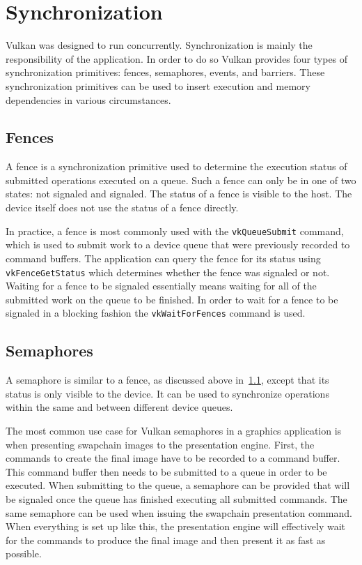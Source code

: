   \section{Synchronization}
    Vulkan was designed to run concurrently. Synchronization is mainly the responsibility of the \gls{application}. In order to do so Vulkan provides four types of synchronization primitives: fences, semaphores, events, and barriers. These synchronization primitives can be used to insert execution and memory dependencies in various circumstances.

    \subsection{Fences}
    \label{sub:Fences}
      A fence is a synchronization primitive used to determine the execution status of submitted operations executed on a queue. Such a fence can only be in one of two states: not signaled and signaled. The status of a fence is visible to the \gls{host}. The device itself does not use the status of a fence directly.

      In practice, a fence is most commonly used with the \lstinline{vkQueueSubmit} command, which is used to submit work to a device queue that were previously recorded to command buffers. The \gls{application} can query the fence for its status using \lstinline{vkFenceGetStatus} which determines whether the fence was signaled or not. Waiting for a fence to be signaled essentially means waiting for all of the submitted work on the queue to be finished. In order to wait for a fence to be signaled in a blocking fashion the \lstinline{vkWaitForFences} command is used.

    \subsection{Semaphores}
    \label{sub:Semaphores}
      A semaphore is similar to a fence, as discussed above in~\ref{sub:Fences}, except that its status is only visible to the device. It can be used to synchronize operations within the same and between different device queues.

      The most common use case for Vulkan semaphores in a graphics \gls{application} is when presenting swapchain images to the presentation engine. First, the commands to create the final image have to be recorded to a command buffer. This command buffer then needs to be submitted to a queue in order to be executed. When submitting to the queue, a semaphore can be provided that will be signaled once the queue has finished executing all submitted commands. The same semaphore can be used when issuing the swapchain presentation command. When everything is set up like this, the presentation engine will effectively wait for the commands to produce the final image and then present it as fast as possible.

